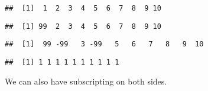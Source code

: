 \documentclass[paper=a4,headsepline,BCOR=12mm,twoside,open=right,%
titlepage,headings=small,fontsize=10pt,index=totoc,bibliography=totoc,%
captions=tableheading,captions=nooneline]{scrbook}\usepackage{knitr}
\begin{document}
\begin{knitrout}\footnotesize
{}\color{fgcolor}\begin{kframe}
\begin{alltt}
 \hlkwb{<-} \hlopt{:}
\end{alltt}
\begin{verbatim}
##  [1]  1  2  3  4  5  6  7  8  9 10
\end{verbatim}
\begin{alltt}
\hlstd{a[}\hlstd{]} \hlkwb{<-} 
\end{alltt}
\begin{verbatim}
##  [1] 99  2  3  4  5  6  7  8  9 10
\end{verbatim}
\begin{alltt}
\hlstd{a[}\hlstd{(}\hlstd{,}\hlstd{)]} \hlkwb{<-} \hlopt{-}
\end{alltt}
\begin{verbatim}
##  [1]  99 -99   3 -99   5   6   7   8   9  10
\end{verbatim}
\begin{alltt}
\hlstd{a[}\hlstd{]} \hlkwb{<-} 
\end{alltt}
\begin{verbatim}
##  [1] 1 1 1 1 1 1 1 1 1 1
\end{verbatim}
\begin{alltt}
 \hlkwb{<-} 
\end{alltt}
\end{kframe}
\end{knitrout}

We can also have subscripting on both sides.
\end{document}
